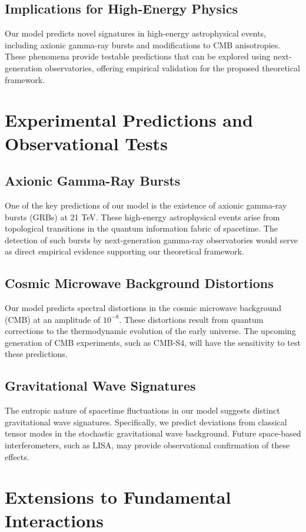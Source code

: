 \documentclass[12pt]{article}
\begin{document}
\subsection{Implications for High-Energy Physics}
Our model predicts novel signatures in high-energy astrophysical events, including axionic gamma-ray bursts and modifications to CMB anisotropies. These phenomena provide testable predictions that can be explored using next-generation observatories, offering empirical validation for the proposed theoretical framework.

\section{Experimental Predictions and Observational Tests}
\subsection{Axionic Gamma-Ray Bursts}
One of the key predictions of our model is the existence of axionic gamma-ray bursts (GRBs) at 21 TeV. These high-energy astrophysical events arise from topological transitions in the quantum information fabric of spacetime. The detection of such bursts by next-generation gamma-ray observatories would serve as direct empirical evidence supporting our theoretical framework.

\subsection{Cosmic Microwave Background Distortions}
Our model predicts spectral distortions in the cosmic microwave background (CMB) at an amplitude of $10^{-8}$. These distortions result from quantum corrections to the thermodynamic evolution of the early universe. The upcoming generation of CMB experiments, such as CMB-S4, will have the sensitivity to test these predictions.

\subsection{Gravitational Wave Signatures}
The entropic nature of spacetime fluctuations in our model suggests distinct gravitational wave signatures. Specifically, we predict deviations from classical tensor modes in the stochastic gravitational wave background. Future space-based interferometers, such as LISA, may provide observational confirmation of these effects.

\section{Extensions to Fundamental Interactions}
\end{document}
